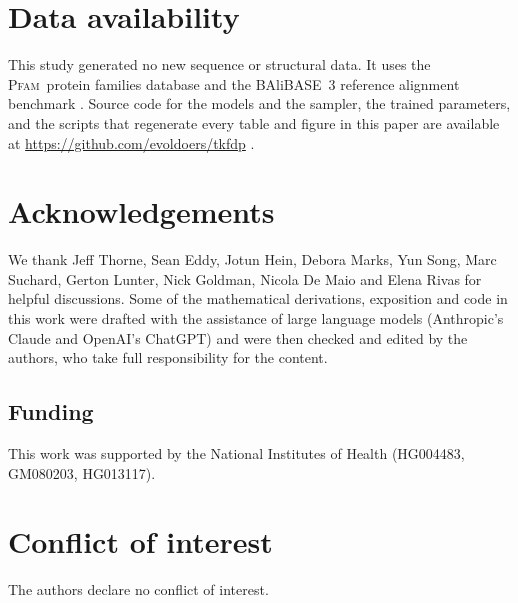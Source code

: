 \documentclass[11pt]{article}
\newcommand{\Pfam}{\textsc{Pfam}}
\begin{document}
\label{endofbody}

\section*{Data availability}

This study generated no new sequence or structural data. It uses the
\Pfam\ protein families database \citep{Pfam2021} and the BAliBASE~3
reference alignment benchmark \citep{Thompson1999}. Source code for the
models and the sampler, the trained parameters, and the scripts that
regenerate every table and figure in this paper are available at
\url{https://github.com/evoldoers/tkfdp} \citep{TKFDPCode}.

\section*{Acknowledgements}

We thank Jeff Thorne, Sean Eddy, Jotun Hein, Debora Marks, Yun Song, Marc
Suchard, Gerton Lunter, Nick Goldman, Nicola De Maio and Elena Rivas for
helpful discussions. Some of the mathematical derivations, exposition and code
in this work were drafted with the assistance of large language models
(Anthropic's Claude and OpenAI's ChatGPT) and were then checked and edited by
the authors, who take full responsibility for the content.

\subsection*{Funding}

This work was supported by the National Institutes of Health
(HG004483, GM080203, HG013117).

\section*{Conflict of interest}

The authors declare no conflict of interest.

\newpage


\end{document}
